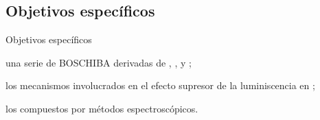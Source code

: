 \documentclass[%
spanish,
mexico]{beamer}
\begin{document}
\subsection{Objetivos específicos}
\begin{frame}{Objetivos específicos}
    \begin{description}[<+- | alert@+>]
        \item[Sintetizar] una serie de \gls{BOSCHIBA} derivadas de , ,  y ;
        \item[Elucidar] los mecanismos involucrados en el efecto supresor de la luminiscencia en ;
        \item[Caracterizar] los compuestos por métodos espectroscópicos.
    \end{description}
\end{frame}
\end{document}
